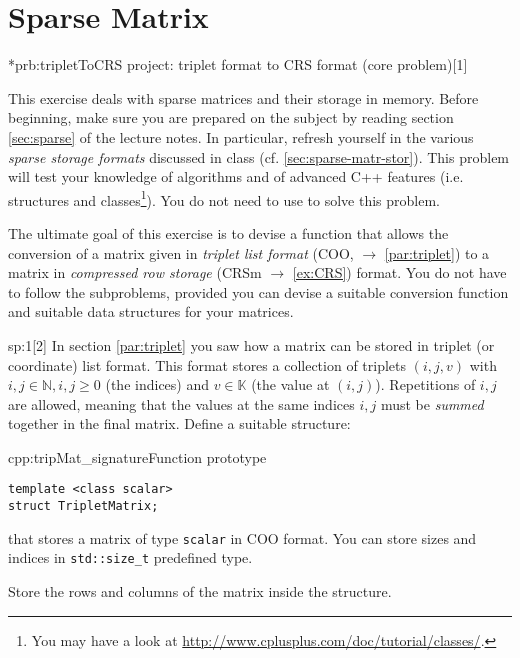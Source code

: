 \chapter{Sparse Matrix}

\begin{samproblem}*{prb:tripletToCRS}{\cpp{} project: triplet format to CRS format (core problem)}[1]{
  This exercise deals with sparse matrices and their storage in memory. 
	Before beginning, make sure you are prepared on the subject by reading section \cref{sec:sparse} of the lecture notes. 
	In particular, refresh yourself in the various \emph{sparse storage formats} discussed in class (cf. \cref{sec:sparse-matr-stor}). 
	This problem will test your knowledge of algorithms and of advanced C++ features 
	(i.e. structures and  classes\footnote{You may have a look at
    \href{http://www.cplusplus.com/doc/tutorial/classes/}{http://www.cplusplus.com/doc/tutorial/classes/}.}). 
	You do not need to use \eigen{} to solve this problem.
 
  The ultimate goal of this exercise is to devise a function that allows the conversion 
	of a matrix given in \emph{triplet list format} (COO, $\to$ \cref{par:triplet}) 
	to a matrix in \emph{compressed row storage} (CRSm $\to$  \cref{ex:CRS}) format. 
	You do not have to follow the subproblems, provided you can devise a suitable conversion function and suitable data structures for your  matrices.
}

\begin{subproblem}{sp:1}[2]
  In section \cref{par:triplet} you saw how a matrix can be stored in triplet (or coordinate) list format. 
	This format stores a collection of triplets $(i,j,v)$ with $i,j \in \mathbb{N}, i,j \geq 0$ (the indices) and $v \in \mathbb{K}$ (the value at $(i,j)$). 
  Repetitions of $i,j$ are allowed, meaning that the values at the same indices $i,j$ must be \emph{summed} together in the final matrix.
  Define a suitable structure:
	\begin{samcode}[C++-code]{cpp:tripMat_signature}{Function prototype}
  	\begin{lstlisting}[style=cpp]
template <class scalar>
struct TripletMatrix;
  	\end{lstlisting}
	\end{samcode}
  that stores a matrix of type \verb|scalar| in COO format. 
	You can store sizes and indices in \verb|std::size_t| predefined type.
  
  \begin{samhint}
    Store the rows and columns of the matrix inside the structure.
  \end{samhint}
  

\end{subproblem}
\end{samproblem}
